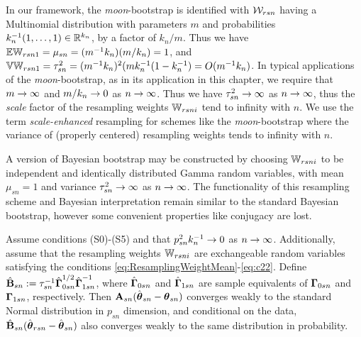 \begin{Example}\label{example:BootExample1}
In our framework, the \textit{moon}-bootstrap is identified with
${\cal{W}}_{r s n}$ having a Multinomial distribution with parameters $m$ and probabilities 
$k_{n}^{-1}(1, \ldots, 1) \in {\mathbb{R}}^{k_{n}}$, by a factor of $k_{n}/m$.  Thus we have 
${\mathbb{E}} {\mathbb{W}}_{r s n 1} = \mu_{s n} = (m^{-1} k_{n}) (m/k_{n}) = 1$, and 
${\mathbb{V}} {\mathbb{W}}_{r s n 1} = \tau_{s n}^{2} = (m^{-1} k_{n})^{2} (m k_{n}^{-1} (1 - k_{n}^{-1}) 
= O( m^{-1} k_{n})$. In typical applications of the \textit{moon}-bootstrap, as  in its 
application in this chapter, we require that $m \rightarrow \infty$ and $m/k_{n} \rightarrow 0$ as 
$n \rightarrow \infty$. Thus we have $\tau_{s n}^{2}  \rightarrow \infty$ as $n \rightarrow \infty$, thus 
the \textit{scale} factor of the resampling weights ${\mathbb{W}}_{r s n i}$ tend to 
infinity with $n$. We use the term \textit{scale-enhanced} resampling for schemes like the
\textit{moon}-bootstrap where the variance of (properly centered) resampling weights 
tends to infinity with $n$.
\end{Example}


\begin{Example}\label{example:BootExample2}
A version of Bayesian bootstrap may be constructed by choosing 
${\mathbb{W}}_{r s n i}$ to be independent and identically distributed Gamma random variables, 
with mean $\mu_{s n} = 1$ and variance $\tau_{s n}^{2}  \rightarrow \infty$ 
as $n \rightarrow \infty$. The functionality of this resampling scheme and Bayesian 
interpretation remain similar to the standard Bayesian bootstrap, however some 
convenient properties like conjugacy are lost.
\end{Example}


\begin{Theorem}\label{Theorem:ResamplingConsistency_Smooth}
Assume conditions (S0)-(S5) and that $p_{s n}^{2} k_{n}^{-1} \rightarrow 0$ as $n \rightarrow \infty$. Additionally, assume that the resampling weights ${\mathbb{W}}_{r s n i}$   are exchangeable random variables satisfying the conditions \ref{eq:ResamplingWeightMean}-\ref{eq:c22}.  Define $\hat {{\mathbf{B}}}_{s n} := \tau_{s n}^{-1} \hat {{\boldsymbol{\Gamma}}}^{1/2}_{0 s n} \hat {{\boldsymbol{\Gamma}}}^{-1}_{1 s n}$, where $\hat {{\boldsymbol{\Gamma}}}_{0 s n}$ and $\hat {{\boldsymbol{\Gamma}}}_{1 s n}$ are sample equivalents of ${\boldsymbol{\Gamma}}_{0 s n}$ and ${\boldsymbol{\Gamma}}_{1 s n}$, respectively.
Then ${\mathbf{A}}_{ s n} (\hat{{\boldsymbol{\theta}}}_{s n} - {{\boldsymbol{\theta}}}_{s n})$ converges weakly to the 
standard Normal distribution in $p_{s n}$ dimension, and conditional on the data, $\hat{{\mathbf{B}}}_{ s n} (\hat{{\boldsymbol{\theta}}}_{r s n} - \hat{{\boldsymbol{\theta}}}_{s n})$ also converges weakly to the same distribution in probability. 
\end{Theorem}

